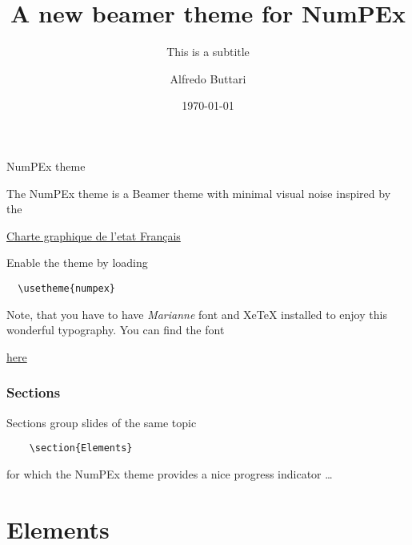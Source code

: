 \documentclass[aspectratio=169]{beamer}
\title{A new beamer theme for NumPEx}
\subtitle{This is a subtitle}
\date{\today}
\author{Alfredo Buttari}
\institute{Institute or miscellaneous information}
\begin{document}
\maketitle

\begin{frame}[fragile]{NumPEx theme}

  The NumPEx theme is a Beamer theme with minimal visual noise
  inspired by the 

  \vspace{0.1cm}
  
  \begin{center}
    \alert{\href{https://www.info.gouv.fr/marque-de-letat}{Charte
        graphique de l'etat Français}}
  \end{center}

  \vspace{0.4cm}
  
  Enable the theme by loading

\begin{verbatim}
  \usetheme{numpex}
\end{verbatim}

  \vspace{0.4cm}

  Note, that you have to have \emph{Marianne} font and XeTeX
  installed to enjoy this wonderful typography. You can find the font
  
  \vspace{0.1cm}
  
  \begin{center}
    \alert{\href{https://www.systeme-de-design.gouv.fr/elements-d-interface/fondamentaux-de-l-identite-de-l-etat/typographie/}{here}}
  \end{center}
\end{frame}

\begin{frame}[fragile]
  \frametitle{Sections}
  Sections group slides of the same topic

\begin{verbatim}
    \section{Elements}
\end{verbatim}

  for which the NumPEx theme provides a nice progress indicator \ldots
\end{frame}

\section{Elements}
\end{document}
